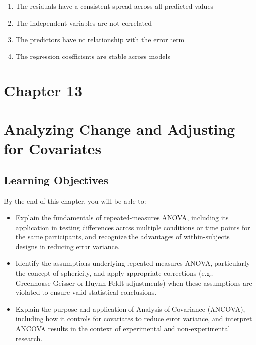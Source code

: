 \documentclass[
  letterpaper,
  DIV=11,
  numbers=noendperiod]{scrreprt}
\begin{document}
\begin{enumerate}
  \begin{enumerate}
  \def\labelenumii{\alph{enumii}.}
  \item
    The residuals have a consistent spread across all predicted values
  \item
    The independent variables are not correlated
  \item
    The predictors have no relationship with the error term
  \item
    The regression coefficients are stable across models
  \end{enumerate}
\end{enumerate}


\chapter{Chapter 13}\label{chapter-13}


\chapter*{Analyzing Change and Adjusting for
Covariates}\label{analyzing-change-and-adjusting-for-covariates}


\section*{Learning Objectives}\label{learning-objectives-12}


By the end of this chapter, you will be able to:

\begin{itemize}
\item
  Explain the fundamentals of repeated-measures ANOVA, including its
  application in testing differences across multiple conditions or time
  points for the same participants, and recognize the advantages of
  within-subjects designs in reducing error variance.
\item
  Identify the assumptions underlying repeated-measures ANOVA,
  particularly the concept of sphericity, and apply appropriate
  corrections (e.g., Greenhouse-Geisser or Huynh-Feldt adjustments) when
  these assumptions are violated to ensure valid statistical
  conclusions.
\item
  Explain the purpose and application of Analysis of Covariance
  (ANCOVA), including how it controls for covariates to reduce error
  variance, and interpret ANCOVA results in the context of experimental
  and non-experimental research.
\end{itemize}
\end{document}
